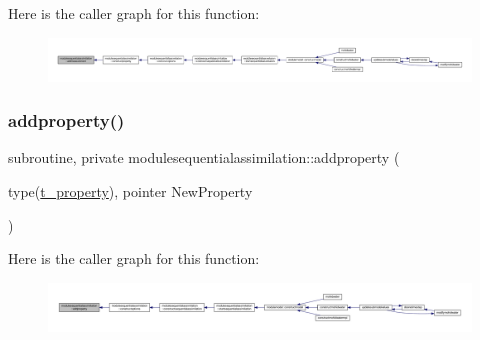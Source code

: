 Here is the caller graph for this function\+:\nopagebreak
\begin{figure}[H]
\begin{center}
\leavevmode
\includegraphics[width=350pt]{namespacemodulesequentialassimilation_a4263d5378b1943e8de2e1465b38720e8_icgraph}
\end{center}
\end{figure}
\mbox{\label{namespacemodulesequentialassimilation_a47355d6dd2eb8e4c089b3f5c5170d3d7}} 
\subsubsection{\texorpdfstring{addproperty()}{addproperty()}}
{\footnotesize\ttfamily subroutine, private modulesequentialassimilation\+::addproperty (\begin{DoxyParamCaption}\item[{type(\mbox{\hyperlink{structmodulesequentialassimilation_1_1t__property}{t\+\_\+property}}), pointer}]{New\+Property }\end{DoxyParamCaption})\hspace{0.3cm}{\ttfamily [private]}}

Here is the caller graph for this function\+:\nopagebreak
\begin{figure}[H]
\begin{center}
\leavevmode
\includegraphics[width=350pt]{namespacemodulesequentialassimilation_a47355d6dd2eb8e4c089b3f5c5170d3d7_icgraph}
\end{center}
\end{figure}
\mbox{\label{namespacemodulesequentialassimilation_a5cad8b44cf828f7b0f86fffd43e9f8a7}} 

